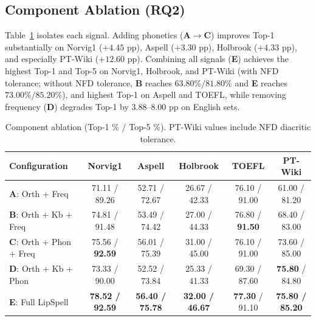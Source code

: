 \documentclass[
  journal=nlp,
  manuscript=research-article,
  year=2026,
]{cup-journal}
\begin{document}
\subsection{Component Ablation (RQ2)}
Table~\ref{tab:comp_ablation} isolates each signal. Adding phonetics (\textbf{A}$\rightarrow$\textbf{C}) improves Top-1 substantially on Norvig1 ($+4.45$ pp), Aspell ($+3.30$ pp), Holbrook ($+4.33$ pp), and especially PT-Wiki ($+12.60$ pp). Combining all signals (\textbf{E}) achieves the highest Top-1 and Top-5 on Norvig1, Holbrook, and PT-Wiki (with NFD tolerance; without NFD tolerance, \textbf{B} reaches $63.80\% / 81.80\%$ and \textbf{E} reaches $73.00\% / 85.20\%$), and highest Top-1 on Aspell and TOEFL, while removing frequency (\textbf{D}) degrades Top-1 by $3.88$--$8.00$ pp on English sets.

\begin{table}[ht]
\centering
\scriptsize
\setlength{\tabcolsep}{3.5pt}
\caption{Component ablation (Top-1 \% / Top-5 \%). PT-Wiki values include NFD diacritic tolerance.}
\label{tab:comp_ablation}
\begin{tabular}{lccccc}
\toprule
Configuration & Norvig1 & Aspell & Holbrook & TOEFL & PT-Wiki \\
\midrule
\textbf{A}: Orth + Freq              & 71.11 / 89.26 & 52.71 / 72.67 & 26.67 / 42.33 & 76.10 / 91.00 & 61.00 / 81.20 \\
\textbf{B}: Orth + Kb + Freq         & 74.81 / 91.48 & 53.49 / 74.42 & 27.00 / 44.33 & 76.80 / \textbf{91.50} & 68.40 / 83.00 \\
\textbf{C}: Orth + Phon + Freq       & 75.56 / \textbf{92.59} & 56.01 / 75.39 & 31.00 / 45.00 & 76.10 / 91.00 & 73.60 / 85.00 \\
\textbf{D}: Orth + Kb + Phon         & 73.33 / 90.00 & 52.52 / 73.84 & 25.33 / 41.33 & 69.30 / 87.60 & \textbf{75.80} / 84.80 \\
\textbf{E}: Full LipSpell            & \textbf{78.52 / 92.59} & \textbf{56.40 / 75.78} & \textbf{32.00 / 46.67} & \textbf{77.30} / 91.10 & \textbf{75.80 / 85.20} \\
\bottomrule
\end{tabular}
\end{table}
\end{document}

